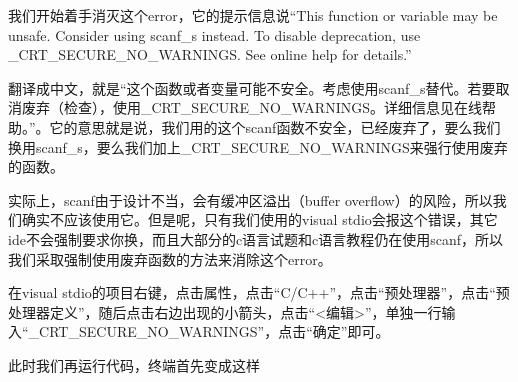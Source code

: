 我们开始着手消灭这个error，它的提示信息说“This function or variable may be unsafe. Consider using scanf\_s instead. To disable deprecation, use \_CRT\_SECURE\_NO\_WARNINGS. See online help for details.”

翻译成中文，就是“这个函数或者变量可能不安全。考虑使用scanf\_s替代。若要取消废弃（检查），使用\_CRT\_SECURE\_NO\_WARNINGS。详细信息见在线帮助。”。它的意思就是说，我们用的这个scanf函数不安全，已经废弃了，要么我们换用scanf\_s，要么我们加上\_CRT\_SECURE\_NO\_WARNINGS来强行使用废弃的函数。

实际上，scanf由于设计不当，会有缓冲区溢出（buffer overflow）的风险，所以我们确实不应该使用它。但是呢，只有我们使用的visual stdio会报这个错误，其它ide不会强制要求你换，而且大部分的c语言试题和c语言教程仍在使用scanf，所以我们采取强制使用废弃函数的方法来消除这个error。

在visual stdio的项目右键，点击属性，点击“C/C++”，点击“预处理器”，点击“预处理器定义”，随后点击右边出现的小箭头，点击“<编辑>”，单独一行输入“\_CRT\_SECURE\_NO\_WARNINGS”，点击“确定”即可。

此时我们再运行代码，终端首先变成这样
